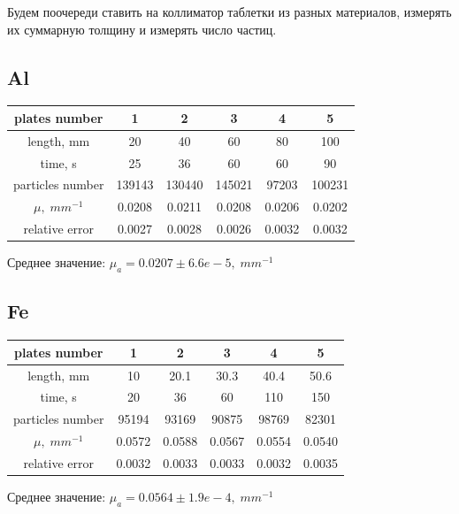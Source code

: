 \documentclass{article}
\begin{document}
Будем поочереди ставить на коллиматор таблетки из разных материалов, измерять их суммарную толщину и
измерять число частиц.

\subsection{Al}

\begin{table}[H]
    \centering
    \begin{tabular}{|c|c|c|c|c|c|}
    \hline
        plates number & 1 & 2 & 3 & 4 & 5 \\ \hline
        length, mm & 20 & 40 & 60 & 80 & 100 \\ \hline
        time, s & 25 & 36 & 60 & 60 & 90 \\ \hline
        particles number & 139143 & 130440 & 145021 & 97203 & 100231 \\ \hline
				$\mu,\; mm^{-1}$ & 0.0208 & 0.0211 & 0.0208 & 0.0206 & 0.0202 \\ \hline
        relative error & 0.0027 & 0.0028 & 0.0026 & 0.0032 & 0.0032 \\ \hline
    \end{tabular}
\end{table}

Среднее значение: \(\mu_a = 0.0207 \pm 6.6e-5,\; mm^{-1}\)

\subsection{Fe}

\begin{table}[H]
    \centering
    \begin{tabular}{|c|c|c|c|c|c|}
    \hline
        plates number & 1 & 2 & 3 & 4 & 5 \\ \hline
        length, mm & 10 & 20.1 & 30.3 & 40.4 & 50.6 \\ \hline
        time, s & 20 & 36 & 60 & 110 & 150 \\ \hline
        particles number & 95194 & 93169 & 90875 & 98769 & 82301 \\ \hline
        $\mu,\; mm^{-1}$ & 0.0572 & 0.0588 & 0.0567 & 0.0554 & 0.0540 \\ \hline
        relative error & 0.0032 & 0.0033 & 0.0033 & 0.0032 & 0.0035 \\ \hline
    \end{tabular}
\end{table}

Среднее значение: \(\mu_a = 0.0564 \pm 1.9e-4,\; mm^{-1}\)
\end{document}
